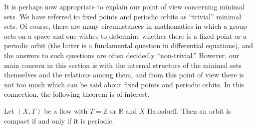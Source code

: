 It is perhaps now appropriate to explain our point of view concerning minimal sets. We have referred to fixed points and periodic orbits as “trivial” minimal sets. Of course, there are many circumstances in mathematics in which a group acts on a space and one wishes to determine whether there is a fixed point or a periodic orbit (the latter is a fundamental question in differential equations), and the answers to such questions are often decidedly “non-trivial.” However, our main concern in this section is with the internal structure of the minimal sets themselves and the relations among them, and from this point of view there is not too much which can be said about fixed points and periodic orbits. In this connection, the following theorem is of interest.


\begin{theorem}
    Let $(X,T)$ be a flow with $T = \mathbb{Z}$ or $\mathbb{R}$ and $X$ Hausdorff. Then an orbit is compact if and only if it is periodic.
\end{theorem}

